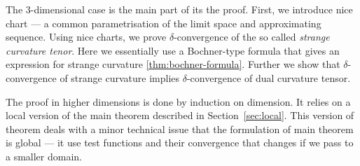 The 3-dimensional case is the main part of its the proof.
First, we introduce nice chart --- a common parametrisation of the limit space and approximating sequence.
Using nice charts, we prove $\delta$-convergence of the so called \emph{strange curvature tenor}.
Here we essentially use a Bochner-type formula that gives an expression for strange curvature \ref{thm:bochner-formula}.
Further we show that $\delta$-convergence of strange curvature implies $\delta$-convergence of dual curvature tensor.

The proof in higher dimensions is done by induction on dimension.
It relies on a local version of the main theorem described in Section~\ref{sec:local}.
This version of theorem deals with a minor technical issue that the formulation of main theorem is global --- it use test functions and their convergence that changes if we pass to a smaller domain. 
